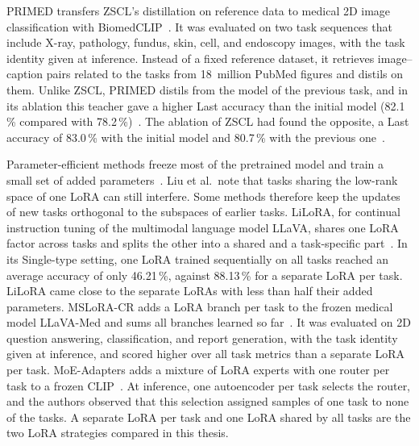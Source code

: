 PRIMED transfers ZSCL's distillation on reference data to medical 2D image classification with BiomedCLIP~\cite{chen2025forgingdynamicmemoryretrievalguided}.
It was evaluated on two task sequences that include X-ray, pathology, fundus, skin, cell, and endoscopy images, with the task identity given at inference.
Instead of a fixed reference dataset, it retrieves image--caption pairs related to the tasks from 18~million PubMed figures and distils on them.
Unlike ZSCL, PRIMED distils from the model of the previous task, and in its ablation this teacher gave a higher Last accuracy than the initial model (82.1\,\% compared with 78.2\,\%)~\cite[Table~4a]{chen2025forgingdynamicmemoryretrievalguided}.
The ablation of ZSCL had found the opposite, a Last accuracy of 83.0\,\% with the initial model and 80.7\,\% with the previous one~\cite[Table~1d]{zheng2023preventingzeroshottransferdegradation}.

Parameter-efficient methods freeze most of the pretrained model and train a small set of added parameters~\cite[Sec.~4.3]{liu2026continuallearningvlmssurvey}.
Liu et al.\ note that tasks sharing the low-rank space of one LoRA can still interfere.
Some methods therefore keep the updates of new tasks orthogonal to the subspaces of earlier tasks.
LiLoRA, for continual instruction tuning of the multimodal language model LLaVA, shares one LoRA factor across tasks and splits the other into a shared and a task-specific part~\cite{che2026loraloraparameterefficientarchitecture}.
In its Single-type setting, one LoRA trained sequentially on all tasks reached an average accuracy of only 46.21\,\%, against 88.13\,\% for a separate LoRA per task.
LiLoRA came close to the separate LoRAs with less than half their added parameters.
MSLoRA-CR adds a LoRA branch per task to the frozen medical model LLaVA-Med and sums all branches learned so far~\cite{Zhang_2025}.
It was evaluated on 2D question answering, classification, and report generation, with the task identity given at inference, and scored higher over all task metrics than a separate LoRA per task.
MoE-Adapters adds a mixture of LoRA experts with one router per task to a frozen CLIP~\cite{yu2024boostingcontinuallearningvisionlanguage}.
At inference, one autoencoder per task selects the router, and the authors observed that this selection assigned samples of one task to none of the tasks.
A separate LoRA per task and one LoRA shared by all tasks are the two LoRA strategies compared in this thesis.

